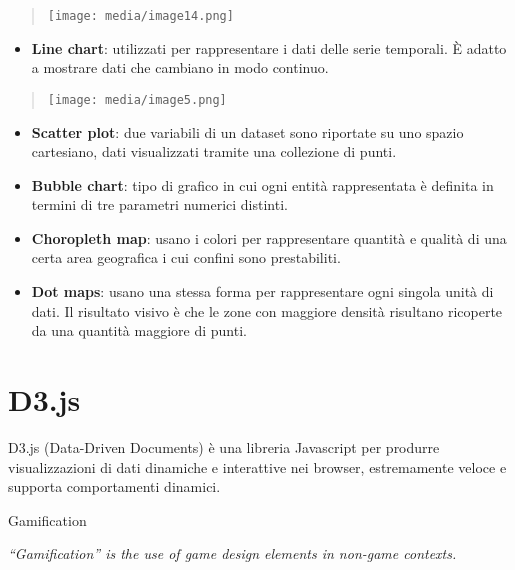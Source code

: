 \begin{quote}
\texttt{[image: media/image14.png]}
\end{quote}

\begin{itemize}
\item
  \textbf{Line chart}: utilizzati per rappresentare i dati delle serie
  temporali. È adatto a mostrare dati che cambiano in modo continuo.
\end{itemize}

\begin{quote}
\texttt{[image: media/image5.png]}
\end{quote}

\begin{itemize}
\item
  \textbf{Scatter plot}: due variabili di un dataset sono riportate su
  uno spazio cartesiano, dati visualizzati tramite una collezione di
  punti.
\item
  \textbf{Bubble chart}: tipo di grafico in cui ogni entità
  rappresentata è definita in termini di tre parametri numerici
  distinti.
\item
  \textbf{Choropleth map}: usano i colori per rappresentare quantità e
  qualità di una certa area geografica i cui confini sono prestabiliti.
\item
  \textbf{Dot maps}: usano una stessa forma per rappresentare ogni
  singola unità di dati. Il risultato visivo è che le zone con maggiore
  densità risultano ricoperte da una quantità maggiore di punti.
\end{itemize}

\section{D3.js}\label{d3.js}

D3.js (Data-Driven Documents) è una libreria Javascript per produrre
visualizzazioni di dati dinamiche e interattive nei browser,
estremamente veloce e supporta comportamenti dinamici.

Gamification

\emph{``Gamification'' is the use of game design elements in non-game
contexts.}
